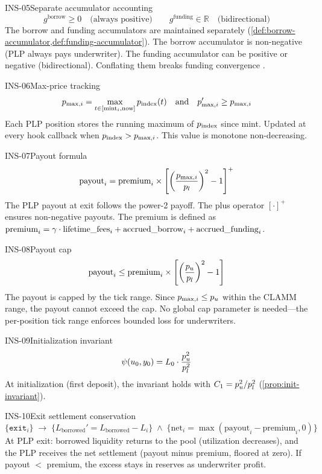\begin{invariant}{INS-05}{Separate accumulator accounting}
\[
  g^{\text{borrow}} \geq 0
  \quad\text{(always positive)}
  \qquad
  g^{\text{funding}} \in \mathbb{R}
  \quad\text{(bidirectional)}
\]
The borrow and funding accumulators are maintained separately
(\cref{def:borrow-accumulator,def:funding-accumulator}).
The borrow accumulator is non-negative (PLP always pays underwriter).
The funding accumulator can be positive or negative (bidirectional).
Conflating them breaks funding convergence \cite{angeris2022perpetuals}.
\end{invariant}

\begin{invariant}{INS-06}{Max-price tracking}
\[
  p_{\max,i} = \max_{t \in [\text{mint}_i, \text{now}]} p_{\text{index}}(t)
  \quad\text{and}\quad
  p_{\max,i}' \geq p_{\max,i}
\]
Each PLP position stores the running maximum of $p_{\text{index}}$ since mint.
Updated at every hook callback when $p_{\text{index}} > p_{\max,i}$.
This value is monotone non-decreasing.
\end{invariant}

\begin{invariant}{INS-07}{Payout formula}
\[
  \text{payout}_i = \text{premium}_i \times \left[\left(\frac{p_{\max,i}}{p_l}\right)^2 - 1\right]^{+}
\]
The PLP payout at exit follows the power-2 payoff. The plus operator
$[\cdot]^+$ ensures non-negative payouts. The premium is defined as
$\text{premium}_i = \gamma \cdot \text{lifetime\_fees}_i
+ \text{accrued\_borrow}_i + \text{accrued\_funding}_i$.
\end{invariant}

\begin{invariant}{INS-08}{Payout cap}
\[
  \text{payout}_i \leq \text{premium}_i \times \left[\left(\frac{p_u}{p_l}\right)^2 - 1\right]
\]
The payout is capped by the tick range. Since $p_{\max,i} \leq p_u$ within
the CLAMM range, the payout cannot exceed the cap. No global cap parameter
is needed---the per-position tick range enforces bounded loss for underwriters.
\end{invariant}

\begin{invariant}{INS-09}{Initialization invariant}
\[
  \psi(u_0, y_0) = L_0 \cdot \frac{p_u^2}{p_l^2}
\]
At initialization (first deposit), the invariant holds with
$C_1 = p_u^2/p_l^2$ (\cref{prop:init-invariant}).
\end{invariant}

\begin{invariant}{INS-10}{Exit settlement conservation}
\[
  \{\texttt{exit}_i\}
  \;\longrightarrow\;
  \{L_{\text{borrowed}}' = L_{\text{borrowed}} - L_i\}
  \;\land\;
  \{\text{net}_i = \max(\text{payout}_i - \text{premium}_i, 0)\}
\]
At PLP exit: borrowed liquidity returns to the pool (utilization decreases),
and the PLP receives the net settlement (payout minus premium, floored at zero).
If payout $<$ premium, the excess stays in reserves as underwriter profit.
\end{invariant}
